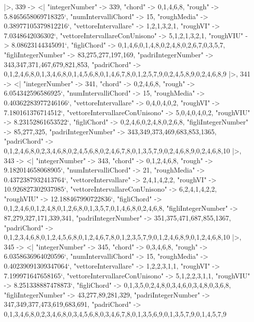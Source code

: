 \documentclass[
]{article}
\begin{document}
\begin{DatasetVerbatim}
  |>,
  339 -> <|
    "integerNumber" -> 339,
    "chord" -> {0,1,4,6,8},
    "rough" -> 5.8465658069718325`,
    "numIntervalliChord" -> 15,
    "roughMedia" -> 0.38977105379812216`,
    "vettoreIntervallare" -> {1,2,1,3,2,1},
    "roughVI" -> 7.0348642036302`,
    "vettoreIntervallareConUnisono" -> {5,1,2,1,3,2,1},
    "roughVIU" -> 8.08623144345091`,
    "figliChord" -> {{0,1,4,6},{0,1,4,8},{0,2,4,8},{0,2,6,7},{0,3,5,7}},
    "figliIntegerNumber" -> {83,275,277,197,169},
    "padriIntegerNumber" -> {343,347,371,467,679,821,853},
    "padriChord" -> {{0,1,2,4,6,8},{0,1,3,4,6,8},{0,1,4,5,6,8},{0,1,4,6,7,8},{0,1,2,5,7,9},{0,2,4,5,8,9},{0,2,4,6,8,9}}
  |>,
  341 -> <|
    "integerNumber" -> 341,
    "chord" -> {0,2,4,6,8},
    "rough" -> 6.054342596586925`,
    "numIntervalliChord" -> 15,
    "roughMedia" -> 0.40362283977246166`,
    "vettoreIntervallare" -> {0,4,0,4,0,2},
    "roughVI" -> 7.180161376714512`,
    "vettoreIntervallareConUnisono" -> {5,0,4,0,4,0,2},
    "roughVIU" -> 8.23152861653522`,
    "figliChord" -> {{0,2,4,6},{0,2,4,8},{0,2,6,8}},
    "figliIntegerNumber" -> {85,277,325},
    "padriIntegerNumber" -> {343,349,373,469,683,853,1365},
    "padriChord" -> {{0,1,2,4,6,8},{0,2,3,4,6,8},{0,2,4,5,6,8},{0,2,4,6,7,8},{0,1,3,5,7,9},{0,2,4,6,8,9},{0,2,4,6,8,10}}
  |>,
  343 -> <|
    "integerNumber" -> 343,
    "chord" -> {0,1,2,4,6,8},
    "rough" -> 9.182014658068905`,
    "numIntervalliChord" -> 21,
    "roughMedia" -> 0.4372387932413764`,
    "vettoreIntervallare" -> {2,4,1,4,2,2},
    "roughVI" -> 10.926827302937985`,
    "vettoreIntervallareConUnisono" -> {6,2,4,1,4,2,2},
    "roughVIU" -> 12.188467990722836`,
    "figliChord" -> {{0,1,2,4,6},{0,1,2,4,8},{0,1,2,6,8},{0,1,3,5,7},{0,1,4,6,8},{0,2,4,6,8}},
    "figliIntegerNumber" -> {87,279,327,171,339,341},
    "padriIntegerNumber" -> {351,375,471,687,855,1367},
    "padriChord" -> {{0,1,2,3,4,6,8},{0,1,2,4,5,6,8},{0,1,2,4,6,7,8},{0,1,2,3,5,7,9},{0,1,2,4,6,8,9},{0,1,2,4,6,8,10}}
  |>,
  345 -> <|
    "integerNumber" -> 345,
    "chord" -> {0,3,4,6,8},
    "rough" -> 6.0358636964020596`,
    "numIntervalliChord" -> 15,
    "roughMedia" -> 0.40239091309347064`,
    "vettoreIntervallare" -> {1,2,2,3,1,1},
    "roughVI" -> 7.199971647658165`,
    "vettoreIntervallareConUnisono" -> {5,1,2,2,3,1,1},
    "roughVIU" -> 8.251338887478873`,
    "figliChord" -> {{0,1,3,5},{0,2,4,8},{0,3,4,6},{0,3,4,8},{0,3,6,8}},
    "figliIntegerNumber" -> {43,277,89,281,329},
    "padriIntegerNumber" -> {347,349,377,473,619,683,691},
    "padriChord" -> {{0,1,3,4,6,8},{0,2,3,4,6,8},{0,3,4,5,6,8},{0,3,4,6,7,8},{0,1,3,5,6,9},{0,1,3,5,7,9},{0,1,4,5,7,9}}

\end{DatasetVerbatim}
\end{document}
